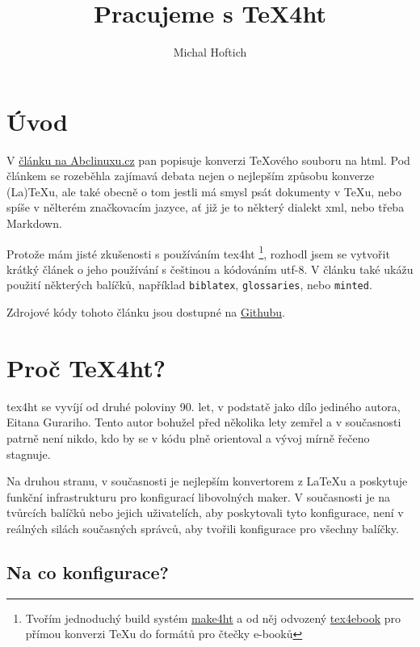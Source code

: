 \documentclass{article}
\begin{document}
\title{Pracujeme s TeX4ht}
\author{Michal Hoftich}
\maketitle
\tableofcontents
\section{Úvod}
V \href{http://www.abclinuxu.cz/clanky/tex-5-priklad-makra-pro-generovani-html}{článku na Abclinuxu.cz} 
pan \textcite{Olsak13}  popisuje konverzi \TeX ového souboru na html. 
Pod článkem se rozeběhla zajímavá debata nejen o nejlepším způsobu konverze
(La)\TeX{}u, ale také obecně o tom jestli má smysl psát dokumenty v \TeX{}u, nebo spíše v nělterém značkovacím jazyce, ať již je to některý dialekt xml, nebo třeba Markdown.

Protože mám jisté zkušenosti s používáním \gls{tex4ht}%
\footnote{Tvořím jednoduchý build systém \href{https://github.com/michal-h21/make4ht}{make4ht} 
a od něj odvozený \href{https://github.com/michal-h21/tex4ebook}{tex4ebook} 
pro přímou konverzi TeXu do formátů pro čtečky e-booků},
rozhodl jsem se vytvořit krátký článek o jeho používání s češtinou a kódováním utf-8. V článku také ukážu použití některých balíčků, například \verb|biblatex|,
\verb|glossaries|, nebo \verb|minted|.

Zdrojové kódy tohoto článku jsou dostupné na \href{https://github.com/michal-h21/abcclanek}{Githubu}.

\section{Proč TeX4ht?}

\gls{tex4ht} se vyvíjí od druhé poloviny 90. let, v podstatě jako dílo 
jediného autora, Eitana Gurariho. Tento autor bohužel před několika lety zemřel
a v současnosti patrně není nikdo, kdo by se v kódu plně orientoval 
a vývoj mírně řečeno stagnuje. 

Na druhou stranu, v současnosti je nejlepším konvertorem z 
\LaTeX u a poskytuje funkční infrastrukturu pro konfigurací libovolných maker. 
V současnosti je na tvůrcích balíčků nebo jejich uživatelích, aby poskytovali 
tyto konfigurace, není v reálných silách současných správců, aby tvořili konfigurace pro všechny balíčky.

\subsection{Na co konfigurace?}
\end{document}
